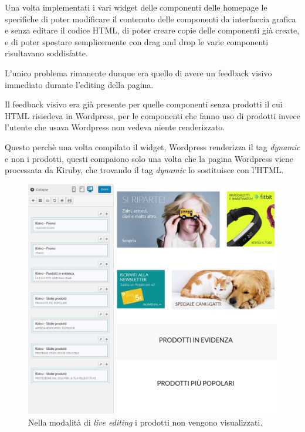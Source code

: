 


Una volta implementati i vari widget delle componenti delle homepage le specifiche di poter
modificare il contenuto delle componenti da interfaccia grafica e senza editare
il codice HTML, di poter creare copie delle componenti già create, e di poter spostare
semplicemente con drag and drop le varie componenti risultavano soddisfatte.

L'unico problema rimanente dunque era quello di avere un feedback visivo immediato durante l'editing della pagina.

Il feedback visivo era già presente per quelle componenti senza prodotti il cui HTML risiedeva in Wordpress,
per le componenti che fanno uso di prodotti invece l'utente che usava Wordpress non vedeva niente renderizzato.

Questo perchè una volta compilato il widget, Wordpress renderizza il tag \emph{dynamic} e non i prodotti,
questi compaiono solo una volta che la pagina Wordpress viene processata da Kiruby, che trovando il tag \emph{dynamic}
lo sostituisce con l'HTML.

\begin{figure}
  \includegraphics[width=\textwidth]{figure/noapi.png}
  \caption{Nella modalità di \emph{live editing} i prodotti non vengono visualizzati.}
  \label{fig:kspec}
\end{figure}

